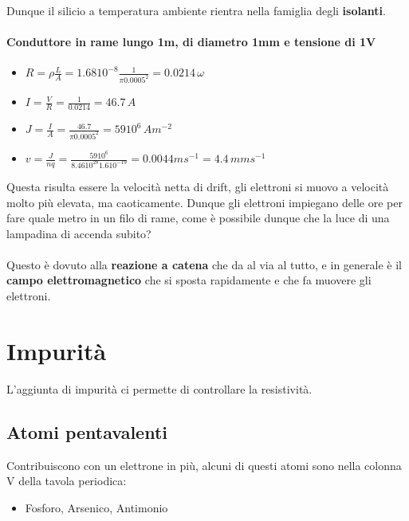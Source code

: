 Dunque il silicio a temperatura ambiente rientra nella famiglia degli \textbf{isolanti}.

\paragraph{Conduttore in rame lungo 1m, di diametro 1mm e tensione di 1V}

\begin{itemize}
\centering
    \item[]  $R = \rho\frac{L}{A} = 1.68 10^{-8} \frac{1}{\pi 0.0005^2} = 0.0214 \,\omega$
    \item[]  $I = \frac{V}{R} = \frac{1}{0.0214} = 46.7\,A$
    \item [] $J = \frac{I}{A} = \frac{46.7}{\pi 0.0005^2 } = 59 10^6\,Am^{-2}$
    \item[]  $v = \frac{J}{nq} = \frac{59 10^6}{8.46 10^{28} 1.6 10^{-19}} = 0.0044 ms^{-1} = 4.4\,mms^{-1}$ 
\end{itemize}

Questa risulta essere la velocità netta di drift, gli elettroni si muovo a	velocità molto	più elevata,	ma	caoticamente.
Dunque gli elettroni impiegano delle ore per fare quale metro in un filo di rame, come è possibile dunque che la luce di una lampadina di accenda subito? 
\paragraph{}
Questo è dovuto alla \textbf{reazione a  catena} che da al via al tutto, e in generale è il \textbf{campo elettromagnetico} che si sposta rapidamente e che fa muovere gli elettroni.

\section{Impurità}
L'aggiunta	di	impurità	ci	permette	di controllare	la	resistività. 

\subsection{Atomi	pentavalenti }
Contribuiscono con un	elettrone	in	più, alcuni di questi atomi sono nella colonna V della tavola periodica:



\begin{itemize}
    \centering
    \item[] Fosforo, Arsenico, Antimonio
\end{itemize}




